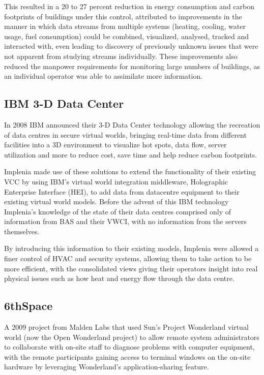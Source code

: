 \documentclass{sig-alternate}
\begin{document}
{	This resulted in a 20 to 27 percent reduction in energy consumption and carbon footprints of buildings under this control, attributed to improvements in the manner in which data streams from multiple systems (heating, cooling, water usage, fuel consumption) could be combined, visualized, analysed, tracked and interacted with, even leading to discovery of previously unknown issues that were not apparent from studying streams individually. These improvements also reduced the manpower requirements for monitoring large numbers of buildings, as an individual operator was able to assimilate more information.
	
\subsection{IBM 3-D Data Center~\cite{IBM2008, Marketwire2008}}
In 2008 IBM announced their 3-D Data Center technology allowing the recreation of data centres in secure virtual worlds, bringing real-time data from different facilities into a 3D environment to visualize hot spots, data flow, server utilization and more to reduce cost, save time and help reduce carbon footprints.
	
	Implenia made use of these solutions to extend the functionality of their existing VCC by using IBM's virtual world integration middleware, Holographic Enterprise Interface (HEI), to add data from datacentre equipment to their existing virtual world models. Before the advent of this IBM technology Implenia's knowledge of the state of their data centres comprised only of information from BAS and their VWCI, with no information from the servers themselves.
	
	By introducing this information to their existing models, Implenia were allowed a finer control of HVAC and security systems, allowing them to take action to be more efficient, with the consolidated views giving their operators insight into real physical issues such as how heat and energy flow through the data centre.

\subsection{6thSpace~\cite{Yankelovich2009}}
A 2009 project from Malden Labs that used Sun's Project Wonderland virtual world (now the Open Wonderland project) to allow remote system administrators to collaborate with on-site staff to diagnose problems with computer equipment, with the remote participants gaining access to terminal windows on the on-site hardware by leveraging Wonderland's application-sharing feature.
	
}
\end{document}
